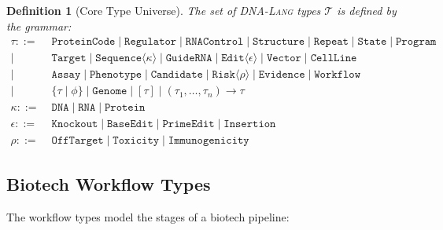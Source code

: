\documentclass[12pt,a4paper]{article}
\newtheorem{definition}[theorem]{Definition}
\newcommand{\DNALang}{\textsc{DNA-Lang}}
\newcommand{\ty}[1]{\texttt{#1}}
\begin{document}
\begin{definition}[Core Type Universe]
The set of \DNALang{} types $\mathcal{T}$ is defined by the grammar:
\begin{align*}
\tau ::=\; & \ty{ProteinCode} \mid \ty{Regulator} \mid \ty{RNAControl} \mid \ty{Structure} \mid \ty{Repeat} \mid \ty{State} \mid \ty{Program} \\
\mid\; & \ty{Target} \mid \ty{Sequence}\langle \kappa \rangle \mid \ty{GuideRNA} \mid \ty{Edit}\langle \epsilon \rangle \mid \ty{Vector} \mid \ty{CellLine} \\
\mid\; & \ty{Assay} \mid \ty{Phenotype} \mid \ty{Candidate} \mid \ty{Risk}\langle \rho \rangle \mid \ty{Evidence} \mid \ty{Workflow} \\
\mid\; & \{\tau \mid \phi\} \mid \ty{Genome} \mid [\tau] \mid (\tau_1, \ldots, \tau_n) \to \tau \\[4pt]
\kappa ::=\; & \ty{DNA} \mid \ty{RNA} \mid \ty{Protein} \\
\epsilon ::=\; & \ty{Knockout} \mid \ty{BaseEdit} \mid \ty{PrimeEdit} \mid \ty{Insertion} \\
\rho ::=\; & \ty{OffTarget} \mid \ty{Toxicity} \mid \ty{Immunogenicity}
\end{align*}
\end{definition}

\subsection{Biotech Workflow Types}

The workflow types model the stages of a biotech pipeline:
\end{document}
